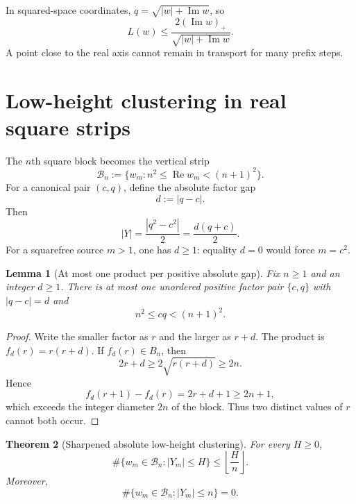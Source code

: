 \documentclass[11pt]{article}
\newtheorem{theorem}{Theorem}[section]
\newtheorem{lemma}[theorem]{Lemma}
\theoremstyle{definition}
\theoremstyle{remark}
\newcommand{\1}{\mathbf{1}}
\newcommand{\Repart}{\operatorname{Re}}
\newcommand{\Impart}{\operatorname{Im}}
\begin{document}
In squared-space coordinates, $q=\sqrt{|w|+\Impart w}$, so
\begin{equation}
 L(w)
 \le
 \frac{2(\Impart w)_+}
 {\sqrt{|w|+\Impart w}}.
 \label{eq:L-w}
\end{equation}
A point close to the real axis cannot remain in transport for many prefix steps.

\section{Low-height clustering in real square strips}
\label{sec:clustering}

The $n$th square block becomes the vertical strip
\begin{equation}
 \mathscr B_n
 :=\{w_m:n^2\le\Repart w_m<(n+1)^2\}.
 \label{eq:complex-block}
\end{equation}
For a canonical pair $(c,q)$, define the absolute factor gap
\begin{equation}
 d:=|q-c|.
 \label{eq:absolute-gap}
\end{equation}
Then
\begin{equation}
 |Y|
 =\frac{|q^2-c^2|}{2}
 =\frac{d(q+c)}{2}.
 \label{eq:Y-absolute-gap}
\end{equation}
For a squarefree source $m>1$, one has $d\ge1$: equality $d=0$ would
force $m=c^2$.

\begin{lemma}[At most one product per positive absolute gap]
\label{lem:one-product-gap}
Fix $n\ge1$ and an integer $d\ge1$.  There is at most one unordered
positive factor pair $\{c,q\}$ with $|q-c|=d$ and
\begin{equation}
 n^2\le cq<(n+1)^2.
 \label{eq:gap-block-condition}
\end{equation}
\end{lemma}

\begin{proof}
Write the smaller factor as $r$ and the larger as $r+d$.  The product is
$f_d(r)=r(r+d)$.  If $f_d(r)\in B_n$, then
\[
 2r+d\ge2\sqrt{r(r+d)}\ge2n.
\]
Hence
\[
 f_d(r+1)-f_d(r)=2r+d+1\ge2n+1,
\]
which exceeds the integer diameter $2n$ of the block.  Thus two
distinct values of $r$ cannot both occur.
\end{proof}

\begin{theorem}[Sharpened absolute low-height clustering]
\label{thm:absolute-clustering}
For every $H\ge0$,
\begin{equation}
 \boxed{
 \#\{w_m\in\mathscr B_n:|Y_m|\le H\}
 \le
 \left\lfloor\frac{H}{n}\right\rfloor.
 }
 \label{eq:absolute-clustering}
\end{equation}
Moreover,
\begin{equation}
 \boxed{
 \#\{w_m\in\mathscr B_n:|Y_m|\le n\}=0.
 }
 \label{eq:no-height-n-points}
\end{equation}
\end{theorem}
\end{document}
